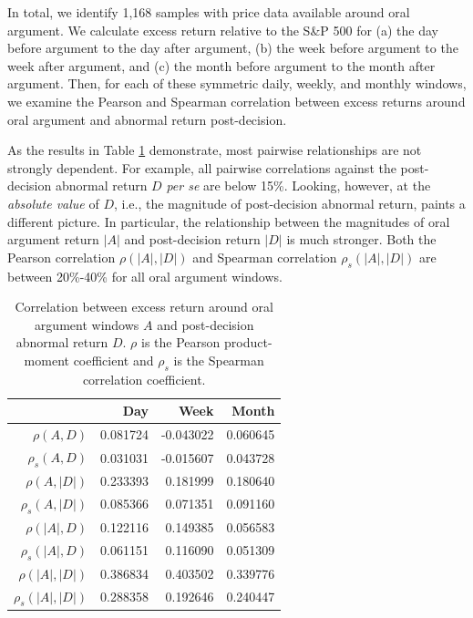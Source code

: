 \documentclass[preprint,12pt]{elsarticle}
\begin{document}
In total, we identify 1,168 samples with price data available around oral argument.  We calculate excess return relative to the S\&P 500 for (a) the day before argument to the day after argument, (b) the week before argument to the week after argument, and (c) the month before argument to the month after argument.  Then, for each of these symmetric daily, weekly, and monthly windows, we examine the Pearson and Spearman correlation between excess returns around oral argument and abnormal return post-decision.

As the results in Table \ref{oral_argument_correlation} demonstrate, most pairwise relationships are not strongly dependent.  For example, all pairwise correlations against the post-decision abnormal return $D$ \textit{per se} are below 15\%.  Looking, however, at the \textit{absolute value} of $D$, i.e., the magnitude of post-decision abnormal return, paints a different picture.  In particular, the relationship between the magnitudes of oral argument return $|A|$ and post-decision return $|D|$ is much stronger.  Both the Pearson correlation $\rho(|A|,|D|)$ and Spearman correlation $\rho_s(|A|,|D|)$ are between 20\%-40\% for all oral argument windows.  

\begin{table}[h!]
\centering
\begin{tabular}{|r|r|r|r|}
\hline
{} &  Day & Week & Month\\\hline
$\rho(A,D)$     &             0.081724 &             -0.043022 &               0.060645 \\
$\rho_s(A,D)$     &             0.031031 &             -0.015607 &               0.043728 \\
\hline
$\rho(A,|D|)$ &             0.233393 &              0.181999 &               0.180640 \\
$\rho_s(A,|D|)$ &             0.085366 &              0.071351 &               0.091160 \\
\hline
$\rho(|A|,D)$     &                 0.122116 &                  0.149385 &                   0.056583 \\
$\rho_s(|A|,D)$     &                 0.061151 &                  0.116090 &                   0.051309 \\
\hline
$\rho(|A|,|D|)$ &                 0.386834 &                  0.403502 &                   0.339776 \\
$\rho_s(|A|,|D|)$ &                 0.288358 &                  0.192646 &                   0.240447 \\
\hline
\end{tabular}
\caption{Correlation between excess return around oral argument windows $A$ and post-decision abnormal return $D$.  $\rho$ is the Pearson product-moment coefficient and $\rho_s$ is the Spearman correlation coefficient.} 
\label{oral_argument_correlation}
\end{table}
\end{document}
